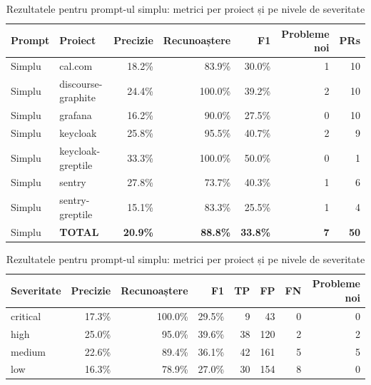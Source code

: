 \documentclass[12pt, a4paper, oneside, romanian]{teza-upb}
\begin{document}
    \begin{table}[H]
      \centering
      \scriptsize
      \setlength{\tabcolsep}{6pt}
      \renewcommand{\arraystretch}{1.3}

      \begin{subtable}[t]{\linewidth}
        \centering
        \begin{tabular}{@{}llrrrrr@{}}
          \toprule
          \textbf{Prompt} & \textbf{Proiect} & \textbf{Precizie} & \textbf{Recunoaștere} & \textbf{F1} & \textbf{Probleme noi} & \textbf{PRs} \\
          \midrule
          Simplu & cal.com            & 18.2\% & 83.9\%  & 30.0\% & 1 & 10 \\
          Simplu & discourse-graphite & 24.4\% & 100.0\% & 39.2\% & 2 & 10 \\
          Simplu & grafana            & 16.2\% & 90.0\%  & 27.5\% & 0 & 10 \\
          Simplu & keycloak           & 25.8\% & 95.5\%  & 40.7\% & 2 &  9 \\
          Simplu & keycloak-greptile  & 33.3\% & 100.0\% & 50.0\% & 0 &  1 \\
          Simplu & sentry             & 27.8\% & 73.7\%  & 40.3\% & 1 &  6 \\
          Simplu & sentry-greptile    & 15.1\% & 83.3\%  & 25.5\% & 1 &  4 \\
          \midrule
          Simplu & \textbf{TOTAL}     & \textbf{20.9\%} & \textbf{88.8\%} & \textbf{33.8\%} & \textbf{7} & \textbf{50} \\
          \bottomrule
        \end{tabular}
        \caption{Metrici per proiect}
      \end{subtable}

      \vspace{4mm}

      \begin{subtable}[t]{\linewidth}
        \centering
        \begin{tabular}{@{}lrrrrrrr@{}}
          \toprule
          \textbf{Severitate} & \textbf{Precizie} & \textbf{Recunoaștere} & \textbf{F1} & \textbf{TP} & \textbf{FP} & \textbf{FN} & \textbf{Probleme noi} \\
          \midrule
          critical & 17.3\% & 100.0\% & 29.5\% &  9 &  43 & 0 & 0 \\
          high     & 25.0\% & 95.0\%  & 39.6\% & 38 & 120 & 2 & 2 \\
          medium   & 22.6\% & 89.4\%  & 36.1\% & 42 & 161 & 5 & 5 \\
          low      & 16.3\% & 78.9\%  & 27.0\% & 30 & 154 & 8 & 0 \\
          \bottomrule
        \end{tabular}
        \caption{Metrici pe nivele de severitate}
      \end{subtable}

      \vspace{2mm}
      \caption{Rezultatele pentru prompt-ul simplu: metrici per proiect și pe nivele de severitate}
      \label{tab:trivial}
    \end{table}
\end{document}
